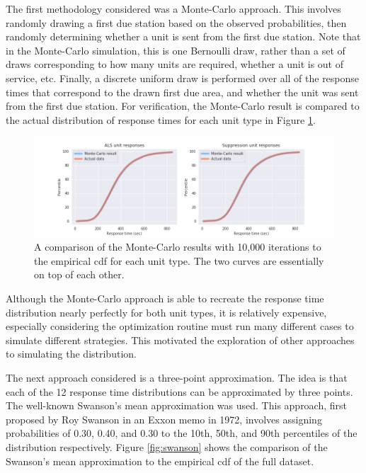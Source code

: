\documentclass[article]{proc}
\begin{document}
The first methodology considered was a Monte-Carlo approach. This involves randomly drawing a first due station based on the observed probabilities, then randomly determining whether a unit is sent from the first due station. Note that in the Monte-Carlo simulation, this is one Bernoulli draw, rather than a set of draws corresponding to how many units are required, whether a unit is out of service, etc. Finally, a discrete uniform draw is performed over all of the response times that correspond to the drawn first due area, and whether the unit was sent from the first due station. For verification, the Monte-Carlo result is compared to the actual distribution of response times for each unit type in Figure \ref{fig:mc_comp}.

\begin{figure}[!htb]
  \centering
  \includegraphics[width=16cm,keepaspectratio]{Figures/mccomp.png}
  \caption{A comparison of the Monte-Carlo results with 10,000 iterations to the empirical cdf for each unit type. The two curves are essentially on top of each other.}
  \label{fig:mc_comp}
\end{figure}

Although the Monte-Carlo approach is able to recreate the response time distribution nearly perfectly for both unit types, it is relatively expensive, especially considering the optimization routine must run many different cases to simulate different strategies. This motivated the exploration of other approaches to simulating the distribution. 

The next approach considered is a three-point approximation. The idea is that each of the 12 response time distributions can be approximated by three points. The well-known Swanson's mean approximation was used. This approach, first proposed by Roy Swanson in an Exxon memo in 1972, involves assigning probabilities of 0.30, 0.40, and 0.30 to the 10th, 50th, and 90th percentiles of the distribution respectively. Figure \ref{fig:swanson} shows the comparison of the Swanson's mean approximation to the empirical cdf of the full dataset. 
\end{document}
